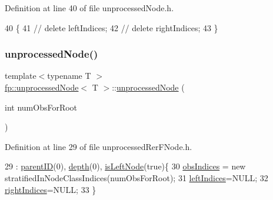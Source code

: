 Definition at line 40 of file unprocessed\+Node.\+h.


\begin{DoxyCode}
40                                   \{
41             \textcolor{comment}{//  delete leftIndices;}
42             \textcolor{comment}{//  delete rightIndices;}
43                 \}
\end{DoxyCode}
\mbox{\label{classfp_1_1unprocessedNode_ae4835a9b488d992f299dbad40c943ae9}} 
\subsubsection{\texorpdfstring{unprocessed\+Node()}{unprocessedNode()}\hspace{0.1cm}{\footnotesize\ttfamily [3/4]}}
{\footnotesize\ttfamily template$<$typename T $>$ \\
\hyperlink{classfp_1_1unprocessedNode}{fp\+::unprocessed\+Node}$<$ T $>$\+::\hyperlink{classfp_1_1unprocessedNode}{unprocessed\+Node} (\begin{DoxyParamCaption}\item[{int}]{num\+Obs\+For\+Root }\end{DoxyParamCaption})\hspace{0.3cm}{\ttfamily [inline]}}



Definition at line 29 of file unprocessed\+Rer\+F\+Node.\+h.


\begin{DoxyCode}
29                                                   :  \hyperlink{classfp_1_1unprocessedNode_a74cb75f76c24622444e531a583b75c3d}{parentID}(0), \hyperlink{classfp_1_1unprocessedNode_a22ebfbc35a57e2d30b81220c94f4d0d3}{depth}(0), 
      \hyperlink{classfp_1_1unprocessedNode_a81b74c36ed1ac15d367e135e2fa0ba3d}{isLeftNode}(\textcolor{keyword}{true})\{
30                     \hyperlink{classfp_1_1unprocessedNode_aba9f03124658f62906fa8ded53cef535}{obsIndices} = \textcolor{keyword}{new} stratifiedInNodeClassIndices(numObsForRoot);
31                     \hyperlink{classfp_1_1unprocessedNode_a8e39fa0144bbb78fd02d1973bd05b5f6}{leftIndices}=NULL;
32                     \hyperlink{classfp_1_1unprocessedNode_ac6886f626536370b1276374d4939291e}{rightIndices}=NULL;
33                 \}
\end{DoxyCode}
\mbox{\label{classfp_1_1unprocessedNode_ac8c960894806adf6ca652a60f5d11e4a}} 
